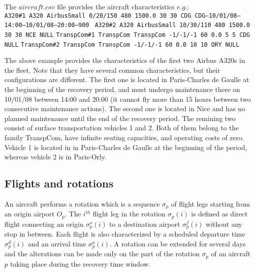 \documentclass[ijoo,nonblindrev]{informs-ijoo}
\begin{document}
The $aircraft.csv$ file provides the aircraft characteristics $e.g.$:\\
\newline
{\texttt{\footnotesize A320\#1 A320 AirbusSmall 0/20/150 480 1500.0 30 30 CDG CDG–10/01/08–14:00–10/01/08–20:00–900 }}
{\texttt{\footnotesize A320\#2 A320 AirbusSmall 10/30/110 480 1500.0 30 30 NCE NULL}}
\newline
{\texttt{\footnotesize TranspCom\#1 TranspCom TranspCom -1/-1/-1 60 0.0 5 5 CDG NULL}}
\newline
{\texttt{\footnotesize TranspCom\#2 TranspCom TranspCom -1/-1/-1 60 0.0 10 10 ORY NULL}}
\newline

The above example provides the characteristics of the first two Airbus A320s in the fleet. Note that they have several common characteristics, but their configurations are different. The first one is located in Paris-Charles de Gaulle at the beginning of the recovery period, and must undergo maintenance there on 10/01/08 between 14:00 and 20:00 (it cannot fly more than 15 hours between two consecutive maintenance actions). The second one is located in Nice and has no planned
maintenance until the end of the recovery period. The remining two consist of surface transportation vehicles 1 and 2. Both of them belong to the family TranspCom, have infinite seating capacities, and operating costs of zero. Vehicle 1 is located in in Paris-Charles de Gaulle at the beginning of the period, whereas vehicle 2 is in Paris-Orly.

\subsection{Flights and rotations} \label{subsec:flightsRotations}

An aircraft performs a rotation which is a sequence $ \sigma_p$ of flight legs starting from an origin airport $O_p$. The $i^{th}$ flight leg in the rotation $ \sigma_p(i)$ is defined as direct flight connecting an origin $ \sigma^o_p(i)$  to a destination airport $ \sigma^f_p(i)$  without any stop in between. Each flight is also characterized by a scheduled departure time $ \sigma^d_p(i)$  and an arrival time $ \sigma^a_p(i)$. A rotation can be extended for several days and the alterations can be made only on the part of the rotation $ \sigma_p$ of an aircraft $p$ taking place during the recovery time window.\\
\end{document}
